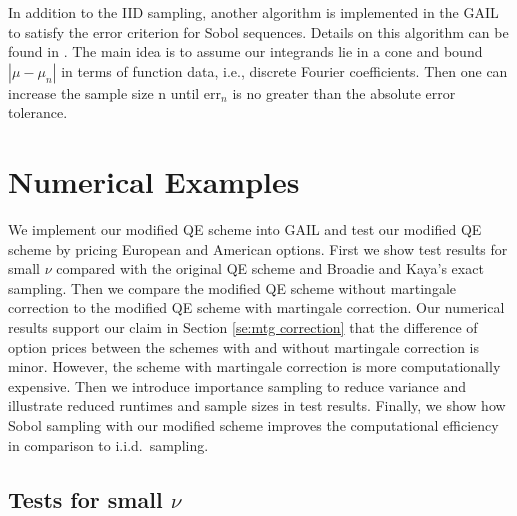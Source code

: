 \documentclass{ws-ijfe}
\begin{document}
In addition to the IID sampling, another algorithm is implemented in the GAIL to satisfy the error criterion for Sobol sequences. Details on this algorithm can be found in \cite{HickernellTonyandDa}. The main idea is to assume our integrands lie in a cone and bound $|\mu-\mu_n|$ in terms of function data, i.e., discrete Fourier coefficients. Then one can increase the sample size n until $\text{err}_n$ is no greater than the absolute error tolerance.


\section{Numerical Examples}

We implement our modified QE scheme into GAIL and test our modified QE scheme by pricing European and American options. First we show test results for small $\nu$ compared with the original QE scheme and Broadie and Kaya's exact sampling. Then we compare the modified QE scheme without martingale correction to the modified QE scheme with martingale correction. Our numerical results support our claim in Section \ref{se:mtg correction} that the difference of option prices between the schemes with and without martingale correction is minor. However, the scheme with martingale correction is more computationally expensive. Then we introduce importance sampling to reduce variance and illustrate reduced runtimes and sample sizes in test results. Finally, we show how Sobol sampling with our modified scheme improves the computational efficiency in comparison to i.i.d.\ sampling.

\subsection{Tests for small $\nu$}
\end{document}
